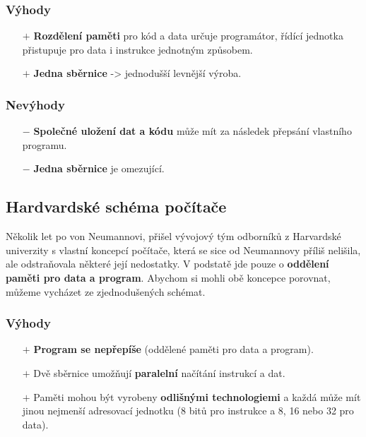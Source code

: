 \subsubsection*{Výhody}
\begin{itemize}
	\item[$+$] \textbf{Rozdělení paměti} pro kód a data určuje programátor, řídící jednotka přistupuje pro  data i instrukce jednotným způsobem.
	\item[$+$] \textbf{Jedna sběrnice} ->  jednodušší levnější výroba.
\end{itemize}
\subsubsection*{Nevýhody}
\begin{itemize}
	\item[$-$] \textbf{Společné uložení dat a kódu} může mít za následek přepsání vlastního programu.
	
	\item[$-$] \textbf{Jedna sběrnice} je omezující.
\end{itemize}

\subsection{Hardvardské schéma počítače}
Několik let po von Neumannovi, přišel vývojový tým odborníků z Harvardské univerzity s vlastní koncepcí počítače, která se sice od Neumannovy příliš nelišila, ale odstraňovala některé její nedostatky. V podstatě jde pouze o \textbf{oddělení paměti pro data a program}. Abychom si mohli obě koncepce porovnat, můžeme vycházet ze zjednodušených schémat.
\newline

\noindent{}

\subsubsection*{Výhody}
\begin{itemize}
	\item[$+$]\textbf{Program se nepřepíše} (oddělené paměti pro data a program).
	\item[$+$]Dvě sběrnice umožňují \textbf{paralelní} načítání instrukcí a dat.
	\item[$+$]Paměti mohou být vyrobeny \textbf{odlišnými technologiemi }a každá může mít jinou nejmenší adresovací jednotku (8 bitů pro instrukce a 8, 16 nebo 32 pro data).
\end{itemize}


